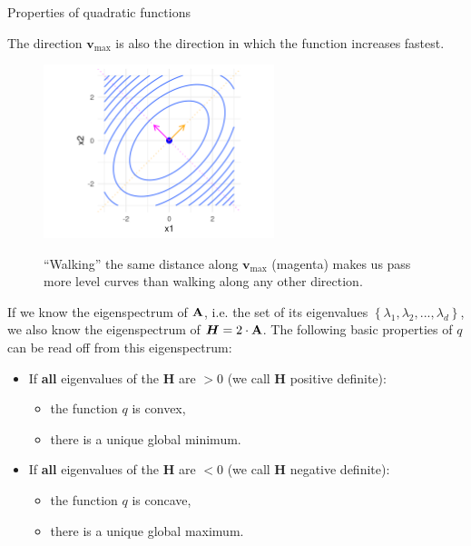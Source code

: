   
  \begin{vbframe}{Properties of quadratic functions}
  
  The direction $\bm{v}_\text{max}$ is also the direction in which the function increases fastest. 
  
  \begin{figure}
    \includegraphics[width=0.6\textwidth]{figure_man/quadratic_functions_2D_example_1_7.png} \\
    \begin{footnotesize}
    \enquote{Walking} the same distance along $\bm{v}_\text{max}$ (magenta) makes us pass more level curves than walking along any other direction.
    \end{footnotesize} 
  \end{figure}
  
  
  \framebreak 
  
  If we know the eigenspectrum of $\mathbf{A}$, i.e. the set of its eigenvalues $\left\{\lambda_1, \lambda_2, ..., \lambda_d\right\}$, we also know the eigenspectrum of $\bm{H} = 2\cdot \mathbf{A}$. The following basic properties of $q$ can be read off from this eigenspectrum: 
  
  \begin{itemize}
    \item If \textbf{all} eigenvalues of the $\bm{H}$ are $>0$ (we call $\bm{H}$ positive definite): 
    \begin{itemize} 
      \item the function $q$ is convex,
      \item there is a unique global minimum. 
    \end{itemize}
    \item If \textbf{all} eigenvalues of the $\bm{H}$ are $<0$ (we call $\bm{H}$ negative definite): 
    \begin{itemize} 
      \item the function $q$ is concave,
      \item there is a unique global maximum. 
    \end{itemize}
  

\end{itemize}
\end{vbframe}
